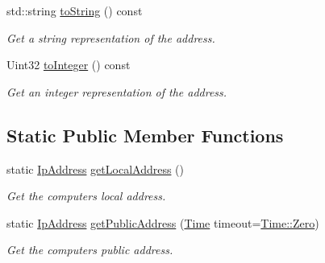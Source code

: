 \begin{DoxyCompactItemize}
std\+::string \mbox{\hyperlink{classsf_1_1_ip_address_a88507954142d7fc2176cce7f36422340}{to\+String}} () const
\begin{DoxyCompactList}\small\item\em Get a string representation of the address. \end{DoxyCompactList}\item 
Uint32 \mbox{\hyperlink{classsf_1_1_ip_address_ae7911c5ea9562f9602c3e29cd54b15e9}{to\+Integer}} () const
\begin{DoxyCompactList}\small\item\em Get an integer representation of the address. \end{DoxyCompactList}\end{DoxyCompactItemize}
\subsection*{Static Public Member Functions}
\begin{DoxyCompactItemize}
\item 
static \mbox{\hyperlink{classsf_1_1_ip_address}{Ip\+Address}} \mbox{\hyperlink{classsf_1_1_ip_address_a4c31622ad87edca48adbb8e8ed00ee4a}{get\+Local\+Address}} ()
\begin{DoxyCompactList}\small\item\em Get the computer\textquotesingle{}s local address. \end{DoxyCompactList}\item 
static \mbox{\hyperlink{classsf_1_1_ip_address}{Ip\+Address}} \mbox{\hyperlink{classsf_1_1_ip_address_a5c5cbf67e4aacf23c24f2ad991df4c55}{get\+Public\+Address}} (\mbox{\hyperlink{classsf_1_1_time}{Time}} timeout=\mbox{\hyperlink{classsf_1_1_time_a8db127b632fa8da21550e7282af11fa0}{Time\+::\+Zero}})
\begin{DoxyCompactList}\small\item\em Get the computer\textquotesingle{}s public address. \end{DoxyCompactList}\end{DoxyCompactItemize}
